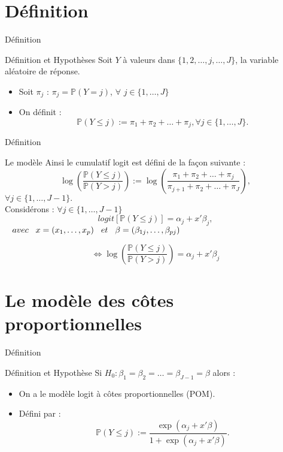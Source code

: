 \documentclass[11pt]{beamer}
\begin{document}
	
	\section{Définition}
	\begin{frame}{Définition}
		\begin{block}{Définition et Hypothèses}
			Soit $Y$ à valeurs dans $\{1, 2, \dots, j, \dots ,J\}$, la variable aléatoire de réponse.
			\begin{itemize}
				\item Soit $\pi_j$ : $\pi_j = \mathbb{P}(Y = j)$, $\forall$ $j \in \{1, \dots ,J\}$
				\item On définit : \[ \mathbb{P}(Y \leq j) := \pi_1 + \pi_2 + \dots + \pi_j, \forall j \in \{1, \dots ,J\}.\] 
				
			\end{itemize} 
			
		\end{block}
	\end{frame}
	
	\begin{frame}{Définition}
		\scriptsize
		\begin{block}{Le modèle}																													Ainsi le cumulatif logit est défini de la façon suivante :
			\[\log \left(\frac{\mathbb{P}(Y \leq j)}{\mathbb{P}(Y > j)}\right) := \log \left(\frac{\pi_1 + \pi_2 + \dots + \pi_j}{\pi_{j+1} + \pi_2 + \dots + \pi_J}\right),\] $\forall j \in \{1, \dots ,J-1\}.$ \\
			Considérons : $\forall j \in \{1, \dots ,J-1\}$
			\[logit [\mathbb{P}(Y \leq j)] = \alpha_j + x' \beta_j,\]$\hspace{3mm}avec\hspace{3mm}
			x =(x_1, \dots ,x_p)\hspace{3mm}et\hspace{3mm}
			\beta=(\beta_{1j}, \dots ,\beta_{pj})$
			
			\[\iff \log \left(\frac{\mathbb{P}(Y \leq j)}{\mathbb{P}(Y > j)}\right) = \alpha_j + x' \beta_j\] 
			
			
		\end{block}
	\end{frame}
	
	\section{Le modèle des côtes proportionnelles}
	\begin{frame}{Définition}
		\begin{block}{Définition et Hypothèse}
			Si $H_0 : \beta_1 = \beta_2 = \dots = \beta_{J-1} = \beta$ alors :
			\begin{itemize}
				\item On a le modèle logit à côtes proportionnelles (POM).
				\item Défini par : \[\mathbb{P}(Y \leq j) := \frac{\exp(\alpha_j + x' \beta)}{1 + \exp(\alpha_j + x' \beta)}.\]
			\end{itemize}
			
		\end{block}
	\end{frame}	
	
\end{document}
